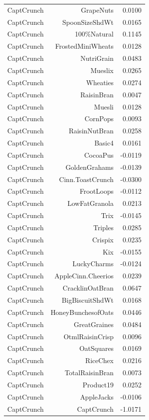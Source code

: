 \begin{longtable}{@{}lrr@{}}
CaptCrunch & GrapeNuts & 0.0100 \\
CaptCrunch & SpoonSizeShdWt & 0.0165 \\
CaptCrunch & 100\%Natural & 0.1145 \\
CaptCrunch & FrostedMiniWheats & 0.0128 \\
CaptCrunch & NutriGrain & 0.0483 \\
CaptCrunch & Mueslix & 0.0265 \\
CaptCrunch & Wheaties & 0.0274 \\
CaptCrunch & RaisinBran & 0.0047 \\
CaptCrunch & Muesli & 0.0128 \\
CaptCrunch & CornPops & 0.0093 \\
CaptCrunch & RaisinNutBran & 0.0258 \\
CaptCrunch & Basic4 & 0.0161 \\
CaptCrunch & CocoaPus & -0.0119 \\
CaptCrunch & GoldenGrahams & -0.0139 \\
CaptCrunch & Cinn.ToastCrunch & -0.0300 \\
CaptCrunch & FrootLoops & -0.0112 \\
CaptCrunch & LowFatGranola & 0.0213 \\
CaptCrunch & Trix & -0.0145 \\
CaptCrunch & Triples & 0.0285 \\
CaptCrunch & Crispix & 0.0235 \\
CaptCrunch & Kix & -0.0155 \\
CaptCrunch & LuckyCharms & -0.0124 \\
CaptCrunch & AppleCinn.Cheerios & 0.0239 \\
CaptCrunch & CracklinOatBran & 0.0647 \\
CaptCrunch & BigBiscuitShdWt & 0.0168 \\
CaptCrunch & HoneyBunchesofOats & 0.0446 \\
CaptCrunch & GreatGraines & 0.0484 \\
CaptCrunch & OtmlRaisinCrisp & 0.0096 \\
CaptCrunch & OatSquares & 0.0169 \\
CaptCrunch & RiceChex & 0.0216 \\
CaptCrunch & TotalRaisinBran & 0.0073 \\
CaptCrunch & Product19 & 0.0252 \\
CaptCrunch & AppleJacks & -0.0106 \\
CaptCrunch & CaptCrunch & -1.0171 \\

\end{longtable}
